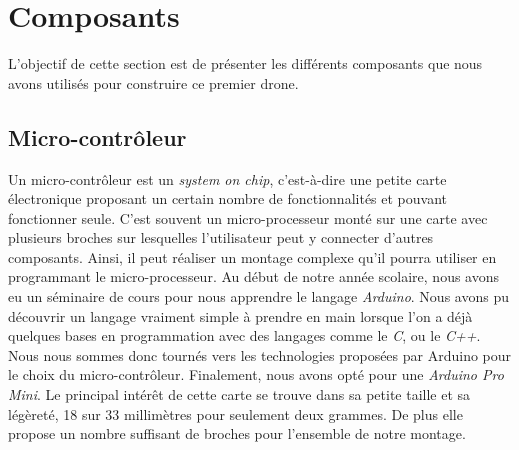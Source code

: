 \documentclass[a4paper,10pt]{report}
\begin{document}
    \section{Composants}
      L'objectif de cette section est de présenter les différents composants 
que nous avons utilisés pour construire ce premier drone.
      
      \subsection{Micro-contrôleur}
	Un micro-contrôleur est un \textit{system on chip}, c'est-à-dire une 
petite carte électronique proposant un certain nombre de fonctionnalités et 
pouvant fonctionner seule. C'est souvent un micro-processeur monté sur une 
carte avec plusieurs broches sur lesquelles l'utilisateur peut y connecter 
d'autres composants. Ainsi, il peut réaliser un montage complexe qu'il pourra 
utiliser en programmant le micro-processeur.
	Au début de notre année scolaire, nous avons eu un séminaire de cours 
pour nous apprendre le langage \textit{Arduino}. Nous avons pu découvrir un 
langage vraiment simple à prendre en main lorsque l'on a déjà quelques bases en 
programmation avec des langages comme le \textit{C}, ou le \textit{C++}. Nous 
nous sommes donc tournés vers les technologies proposées par Arduino pour le 
choix du micro-contrôleur. Finalement, nous avons opté pour une \textit{Arduino 
Pro Mini}. Le principal intérêt de cette carte se trouve dans sa petite taille 
et sa légèreté, 18 sur 33 millimètres pour seulement deux grammes. De plus elle 
propose un nombre suffisant de broches pour l'ensemble de notre montage.
	
\end{document}
